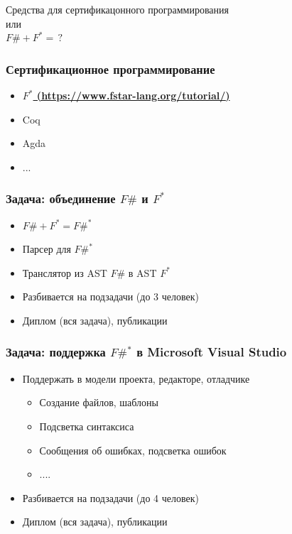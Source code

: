 \documentclass{beamer}
\begin{document}
\begin{frame}[plain,c]
 \transwipe[direction=90]
 \begin{center}
  \Huge Средства для сертификацонного программирования \\ или \\ $F\# + F^* = \, ?$
 \end{center}
\end{frame}

\begin{frame}[fragile]
  \transwipe[direction=90]
  \frametitle{Сертификационное программирование}
  \begin{itemize}
    \item \underline{\bfseries{$F^*$} (\url{https://www.fstar-lang.org/tutorial/})}
    \item Coq
    \item Agda
    \item ...
  \end{itemize}


\end{frame}


\begin{frame}
  \transwipe[direction=90]
  \frametitle{Задача: объединение $F\#$ и $F^*$}
  \begin{itemize}
    \item $F\# + F^* = F\#^*$
    \item Парсер для $F\#^*$
    \item Транслятор из AST $F\#$ в AST $F^*$
    \item Разбивается на подзадачи (до 3 человек)
    \item Диплом (вся задача), публикации
  \end{itemize}
\end{frame}

\begin{frame}
  \transwipe[direction=90]
  \frametitle{Задача: поддержка $F\#^*$ в Microsoft Visual Studio}
  \begin{itemize}
    \item Поддержать в модели проекта, редакторе, отладчике
      \begin{itemize}
        \item Создание файлов, шаблоны
        \item Подсветка синтаксиса
        \item Сообщения об ошибках, подсветка ошибок
        \item ....
      \end{itemize}
    \item Разбивается на подзадачи (до 4 человек)
    \item Диплом (вся задача), публикации
  \end{itemize}
\end{frame}
\end{document}
